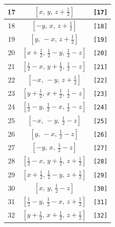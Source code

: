 \documentclass[fleqn,8pt]{jsarticle}
\begin{document}
\begin{longtable}{ccc}
17 & $\left[ x,\, y,\, z + \frac{1}{2} \right]$ & {\tt [17]} \\ \hline
18 & $\left[ - y,\, x,\, z + \frac{1}{2} \right]$ & {\tt [18]} \\ \hline
19 & $\left[ y,\, - x,\, z + \frac{1}{2} \right]$ & {\tt [19]} \\ \hline
20 & $\left[ x + \frac{1}{2},\, \frac{1}{2} - y,\, \frac{1}{2} - z \right]$ & {\tt [20]} \\ \hline
21 & $\left[ \frac{1}{2} - x,\, y + \frac{1}{2},\, \frac{1}{2} - z \right]$ & {\tt [21]} \\ \hline
22 & $\left[ - x,\, - y,\, z + \frac{1}{2} \right]$ & {\tt [22]} \\ \hline
23 & $\left[ y + \frac{1}{2},\, x + \frac{1}{2},\, \frac{1}{2} - z \right]$ & {\tt [23]} \\ \hline
24 & $\left[ \frac{1}{2} - y,\, \frac{1}{2} - x,\, \frac{1}{2} - z \right]$ & {\tt [24]} \\ \hline
25 & $\left[ - x,\, - y,\, \frac{1}{2} - z \right]$ & {\tt [25]} \\ \hline
26 & $\left[ y,\, - x,\, \frac{1}{2} - z \right]$ & {\tt [26]} \\ \hline
27 & $\left[ - y,\, x,\, \frac{1}{2} - z \right]$ & {\tt [27]} \\ \hline
28 & $\left[ \frac{1}{2} - x,\, y + \frac{1}{2},\, z + \frac{1}{2} \right]$ & {\tt [28]} \\ \hline
29 & $\left[ x + \frac{1}{2},\, \frac{1}{2} - y,\, z + \frac{1}{2} \right]$ & {\tt [29]} \\ \hline
30 & $\left[ x,\, y,\, \frac{1}{2} - z \right]$ & {\tt [30]} \\ \hline
31 & $\left[ \frac{1}{2} - y,\, \frac{1}{2} - x,\, z + \frac{1}{2} \right]$ & {\tt [31]} \\ \hline
32 & $\left[ y + \frac{1}{2},\, x + \frac{1}{2},\, z + \frac{1}{2} \right]$ & {\tt [32]} \\
\end{longtable}
\end{document}
